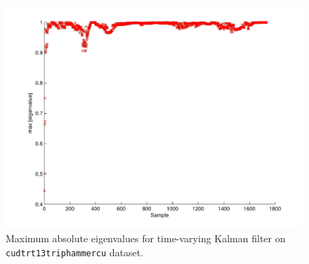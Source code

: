 \begin{figure}
\includegraphics[width=\columnwidth]{eigenvalues}
\caption{Maximum absolute eigenvalues for time-varying Kalman filter on \texttt{cudtrt13triphammercu} dataset.}
\label{fig:max_eigenvalue}
\end{figure}

